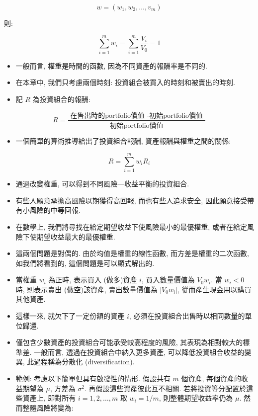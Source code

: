 \documentclass[letterpaper]{article}
\begin{document}
		$$
		w=\left (w_{1}, w_{2}, \ldots, v_{m}\right)
		$$
		
		則: 
		
		$$
		\sum_{i=1}^{m} w_{i}=\sum_{i=1}^{m} \frac{V_{i}}{V_{0}}=1
		$$
		
		\begin{itemize}
			\item 一般而言, 權重是時間的函數, 因為不同資產的報酬率是不同的. 
			\item 在本章中, 我們只考慮兩個時刻: 投資組合被買入的時刻和被賣出的時刻. 
			\item 記 $R$ 為投資組合的報酬: 
		\end{itemize}
		
		$$
		R=\frac{\text { 在售出時的portfolio價值 -初始portfolio價值 }}{\text { 初始portfolio價值 }}
		$$
		
		\begin{itemize}
			\item 一個簡單的算術推導給出了投資組合報酬, 資產報酬與權重之間的關係: 
		\end{itemize}
		
		$$
		R=\sum_{i=1}^{m} w_{i} R_{i}
		$$
		
		\begin{itemize}
			\item 通過改變權重, 可以得到不同風險—收益平衡的投資組合.   
			\item 有些人願意承擔高風險以期獲得高回報, 而也有些人追求安全, 因此願意接受帶有小風險的中等回報.   
			\item 在數學上, 我們將尋找在給定期望收益下使風險最小的最優權重, 或者在給定風險下使期望收益最大的最優權重.   
			\item 這兩個問題是對偶的. 由於均值是權重的線性函數, 而方差是權重的二次函數, 如我們將看到的, 這個問題是可以顯式解出的.   
			\item 當權重 $w_{i}$ 為正時, 表示買入 (做多)資產 $i$, 買入數量價值為 $V_{0} w_{i}$.   
			當 $w_{i}<0$ 時, 則表示賣出 (做空)該資產, 賣出數量價值為 $\left|V_{0} w_{i}\right|$, 從而產生現金用以購買其他資產.   
			
			\item 這樣一來, 就欠下了一定份額的資產 $i$, 必須在投資組合出售時以相同數量的單位歸還.   
			
			\item 僅包含少數資產的投資組合可能承受較高程度的風險, 其表現為相對較大的標準差. 一般而言, 透過在投資組合中納入更多資產, 可以降低投資組合收益的變異, 此過程稱為分散化 (diversification).   
			
			\item 範例: 考慮以下簡單但具有啟發性的情形. 假設共有 $m$ 個資產, 每個資產的收益期望為 $\mu$, 方差為 $\sigma^{2}$. 再假設這些資產彼此互不相關. 若將投資等分配置於這些資產上, 即對所有 $i=1, 2, \ldots, m$ 取 $w_{i}=1/m$, 則整體期望收益率仍為 $\mu$. 然而整體風險將變為: 
			
		\end{itemize}
		
\end{document}
